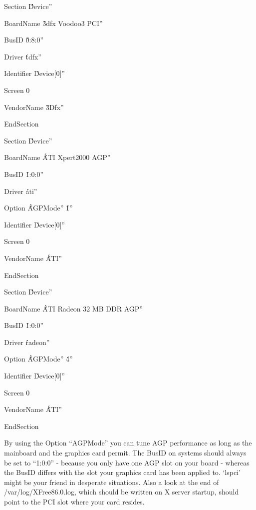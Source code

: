 \begin{ttfamily}
\noindent
  Section \'\'Device''
    
  
    BoardName  	\'\'3dfx Voodoo3 PCI'' 
        
    BusID  	\'\'0:8:0''
        
    Driver  	\'\'tdfx''
    
    Identifier  \'\'Device[0]''
    
    Screen  	0
    
    VendorName  \'\'3Dfx''
    
 
\noindent   
  EndSection
  \medskip

\noindent   
  Section \'\'Device''
  
  
    BoardName  	\'\'ATI Xpert2000 AGP''
    
    BusID  	\'\'1:0:0''
    
    Driver  	\'\'ati''
    
    Option	\'\'AGPMode'' \'\'1''
    
    Identifier  \'\'Device[0]''
    
    Screen  	0
    
    VendorName  \'\'ATI''
    
 \noindent   
  EndSection
 \medskip

\noindent   
  Section \'\'Device''
  
    BoardName    \'\'ATI Radeon 32 MB DDR AGP''
    
    BusID        \'\'1:0:0''
    
    Driver       \'\'radeon''
    
    Option	 \'\'AGPMode'' \'\'4''
    
    Identifier   \'\'Device[0]''
    
    Screen       0
    
    VendorName   \'\'ATI''
    
\noindent   
  EndSection
  \medskip
  \end{ttfamily}

By using the Option ``AGPMode'' you can tune AGP performance as long as the
mainboard and the graphics card permit. The BusID on  systems should
always be set to ``1:0:0'' - because you only have one AGP slot on your board
- whereas the  BusID differs with the slot your graphics card has been
applied to. `lspci' might be your friend in desperate situations. Also a
look at the end of /var/log/XFree86.0.log, which should be written on X
server startup, should point to the PCI slot where your card resides.

